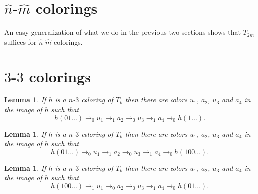 \documentclass[a4paper]{article}
\newtheorem{lemma}[theorem]{Lemma}
\begin{document}
\section{$\hat{n}$-$\hat{m}$ colorings}

An easy generalization of what we do in the previous two sections shows
that $T_{2m}$ suffices for $\hat{n}$-$\hat{m}$ colorings.

\section{$3$-$3$ colorings}

\begin{lemma} \label{three one}
 If $h$ is a $n$-$3$ coloring of $T_k$ then there are colors $u_1$,
$a_2$, $u_3$ and $a_4$ in the image of $h$ such that
\[
 h(01\dots) \rightarrow_0 u_1 \rightarrow_1 a_2 \rightarrow_0 u_3
\rightarrow_1 a_4 \rightarrow_0 h(1\dots).
\]
\end{lemma}
\begin{lemma} \label{three one}
 If $h$ is a $n$-$3$ coloring of $T_k$ then there are colors $u_1$,
$a_2$, $u_3$ and $a_4$ in the image of $h$ such that
\[
 h(01\dots) \rightarrow_0 u_1 \rightarrow_1 a_2 \rightarrow_0 u_3
\rightarrow_1 a_4 \rightarrow_0 h(100\dots).
\]
\end{lemma}
\begin{lemma} \label{three one}
 If $h$ is a $n$-$3$ coloring of $T_k$ then there are colors $u_1$,
$a_2$, $u_3$ and $a_4$ in the image of $h$ such that
\[
 h(100\dots) \rightarrow_1 u_1 \rightarrow_0 a_2 \rightarrow_0 u_3
\rightarrow_1 a_4 \rightarrow_0 h(01\dots).
\]
\end{lemma}
\end{document}
